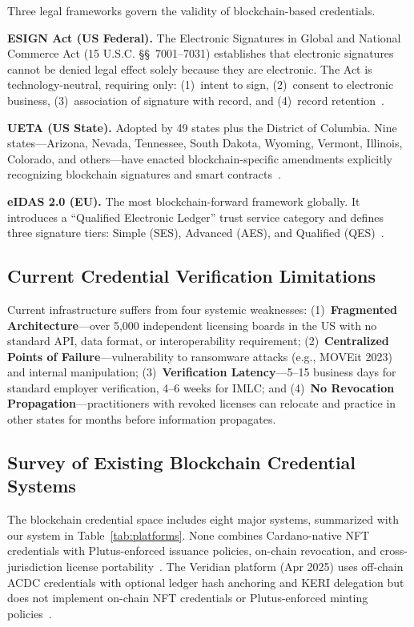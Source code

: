 \documentclass[conference,10pt]{IEEEtran}
\begin{document}
Three legal frameworks govern the validity of blockchain-based credentials.

\textbf{ESIGN Act (US Federal).} The Electronic Signatures in Global and National Commerce Act (15 U.S.C. \S\S~7001--7031) establishes that electronic signatures cannot be denied legal effect solely because they are electronic. The Act is technology-neutral, requiring only: (1)~intent to sign, (2)~consent to electronic business, (3)~association of signature with record, and (4)~record retention~\cite{esign}.

\textbf{UETA (US State).} Adopted by 49 states plus the District of Columbia. Nine states---Arizona, Nevada, Tennessee, South Dakota, Wyoming, Vermont, Illinois, Colorado, and others---have enacted blockchain-specific amendments explicitly recognizing blockchain signatures and smart contracts~\cite{arizona2017,vermont2016}.

\textbf{eIDAS 2.0 (EU).} The most blockchain-forward framework globally. It introduces a ``Qualified Electronic Ledger'' trust service category and defines three signature tiers: Simple (SES), Advanced (AES), and Qualified (QES)~\cite{eidas2024}.

\subsection{Current Credential Verification Limitations}

Current infrastructure suffers from four systemic weaknesses: (1)~\textbf{Fragmented Architecture}---over 5,000 independent licensing boards in the US with no standard API, data format, or interoperability requirement; (2)~\textbf{Centralized Points of Failure}---vulnerability to ransomware attacks (e.g., MOVEit 2023) and internal manipulation; (3)~\textbf{Verification Latency}---5--15 business days for standard employer verification, 4--6 weeks for IMLC; and (4)~\textbf{No Revocation Propagation}---practitioners with revoked licenses can relocate and practice in other states for months before information propagates.

\subsection{Survey of Existing Blockchain Credential Systems}

The blockchain credential space includes eight major systems, summarized with our system in Table~\ref{tab:platforms}. None combines Cardano-native NFT credentials with Plutus-enforced issuance policies, on-chain revocation, and cross-jurisdiction license portability~\cite{blockcerts,hyperledger2024,identus2024}. The Veridian platform (Apr 2025) uses off-chain ACDC credentials with optional ledger hash anchoring and KERI delegation but does not implement on-chain NFT credentials or Plutus-enforced minting policies~\cite{veridian2025}.
\end{document}
